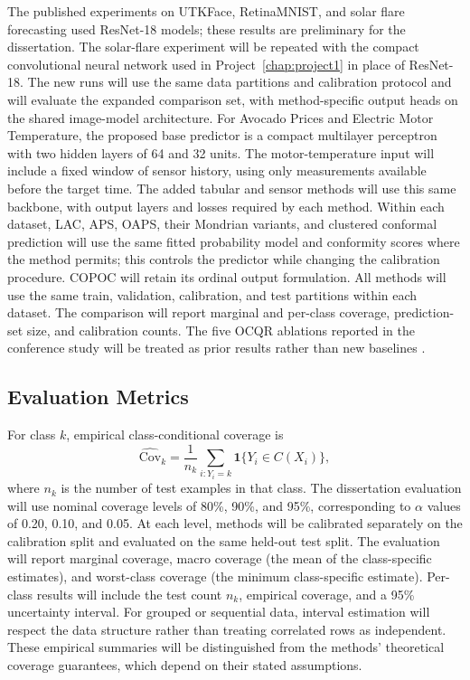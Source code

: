 \documentclass[12pt]{report}
\begin{document}
The published experiments on UTKFace, RetinaMNIST, and solar flare forecasting used ResNet-18 models; these results are preliminary for the dissertation. The solar-flare experiment will be repeated with the compact convolutional neural network used in Project~\ref{chap:project1} in place of ResNet-18. The new runs will use the same data partitions and calibration protocol and will evaluate the expanded comparison set, with method-specific output heads on the shared image-model architecture. For Avocado Prices and Electric Motor Temperature, the proposed base predictor is a compact multilayer perceptron with two hidden layers of 64 and 32 units. The motor-temperature input will include a fixed window of sensor history, using only measurements available before the target time. The added tabular and sensor methods will use this same backbone, with output layers and losses required by each method. Within each dataset, LAC, APS, OAPS, their Mondrian variants, and clustered conformal prediction will use the same fitted probability model and conformity scores where the method permits; this controls the predictor while changing the calibration procedure. COPOC will retain its ordinal output formulation. All methods will use the same train, validation, calibration, and test partitions within each dataset. The comparison will report marginal and per-class coverage, prediction-set size, and calibration counts. The five OCQR ablations reported in the conference study will be treated as prior results rather than new baselines \citep{hong2026ocqr}.

\subsection{Evaluation Metrics}

For class \(k\), empirical class-conditional coverage is
\begin{equation}
\widehat{\mathrm{Cov}}_k=
\frac{1}{n_k}\sum_{i:Y_i=k}\mathbf{1}\{Y_i\in C(X_i)\},
\label{eq:ocqr-empirical-class-coverage}
\end{equation}
where \(n_k\) is the number of test examples in that class. The dissertation evaluation will use nominal coverage levels of 80\%, 90\%, and 95\%, corresponding to \(\alpha\) values of 0.20, 0.10, and 0.05. At each level, methods will be calibrated separately on the calibration split and evaluated on the same held-out test split. The evaluation will report marginal coverage, macro coverage (the mean of the class-specific estimates), and worst-class coverage (the minimum class-specific estimate). Per-class results will include the test count \(n_k\), empirical coverage, and a 95\% uncertainty interval. For grouped or sequential data, interval estimation will respect the data structure rather than treating correlated rows as independent. These empirical summaries will be distinguished from the methods' theoretical coverage guarantees, which depend on their stated assumptions.
\end{document}
